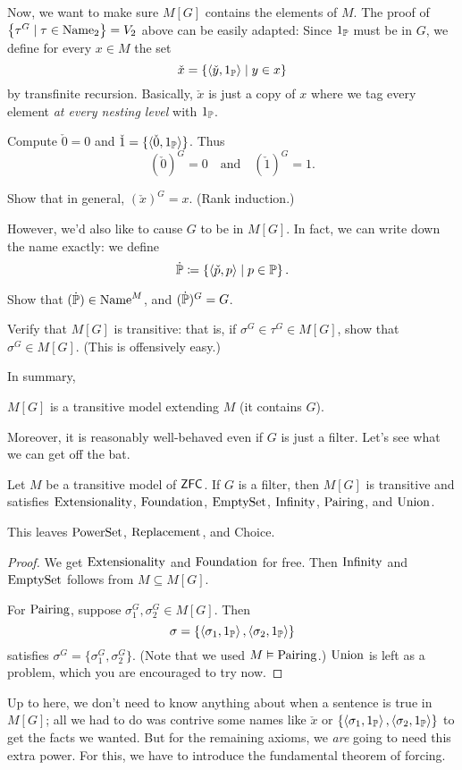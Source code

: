 Now, we want to make sure $M[G]$ contains the elements of $M$.
The proof of $\left\{ \tau^G \mid \tau \in \text{Name}_2 \right\} = V_2$ above can be easily adapted:
Since $1_\mathbb P$ must be in $G$, we define
for every $x \in M$ the set
\[ \check x = \left\{ \left<\check y, 1_\mathbb P\right> \mid y \in x \right\} \]
by transfinite recursion.
Basically, $\check x$ is just a copy of $x$ where we tag every element \emph{at every nesting level}
with $1_\mathbb P$.

\begin{example}
	Compute $\check 0 = 0$ and $\check 1 = \{ \langle \check 0, 1_\mathbb P \rangle \}$.
	Thus \[ (\check 0)^G = 0 \quad\text{and}\quad (\check 1)^G = 1. \]
\end{example}
\begin{ques}
	Show that in general, $(\check x)^G = x$.
	(Rank induction.)
\end{ques}

However, we'd also like to cause $G$ to be in $M[G]$.
In fact, we can write down the name exactly: we define
\[ \dot {\mathbb P} \coloneqq \left\{ \left<\check p, p\right> \mid p \in \mathbb P \right\}. \]
\begin{ques}
	Show that $(\dot {\mathbb P}) \in \text{Name}^M$, and $(\dot {\mathbb P})^G = G$.
\end{ques}
\begin{ques}
	Verify that $M[G]$ is transitive:
	that is, if $\sigma^G \in \tau^G \in M[G]$, show that $\sigma^G \in M[G]$.
	(This is offensively easy.)
\end{ques}

In summary,
\begin{moral}
	$M[G]$ is a transitive model extending $M$ (it contains $G$).
\end{moral}

Moreover, it is reasonably well-behaved even if $G$ is just a filter.
Let's see what we can get off the bat.
\begin{lemma}
	Let $M$ be a transitive model of $\mathsf{ZFC}$.
	If $G$ is a filter, then $M[G]$ is transitive
	and satisfies $\mathrm{Extensionality}$, $\mathrm{Foundation}$,
	$\mathrm{EmptySet}$, $\mathrm{Infinity}$, $\mathrm{Pairing}$, and $\mathrm{Union}$.
\end{lemma}

This leaves $\mathrm{PowerSet}$, $\mathrm{Replacement}$, and Choice.
\begin{proof}
	We get $\mathrm{Extensionality}$ and $\mathrm{Foundation}$ for free.
	Then $\mathrm{Infinity}$ and $\mathrm{EmptySet}$ follows from $M \subseteq M[G]$.

	For $\mathrm{Pairing}$, suppose $\sigma_1^G, \sigma_2^G \in M[G]$.
	Then
	\[ \sigma =
		\left\{ \left<\sigma_1, 1_\mathbb P\right>, \left<\sigma_2, 1_\mathbb P\right> \right\}
	\]
	satisfies $\sigma^G = \{\sigma_1^G, \sigma_2^G\}$.
	(Note that we used $M \vDash \mathrm{Pairing}$.)
	$\mathrm{Union}$ is left as a problem, which you are encouraged to try now.
\end{proof}
Up to here, we don't need to know anything about when a sentence is true in $M[G]$;
all we had to do was contrive some names like $\check x$ or
$\left\{ \left<\sigma_1, 1_\mathbb P\right>, \left<\sigma_2, 1_\mathbb P\right> \right\}$
to get the facts we wanted.
But for the remaining axioms, we \emph{are} going to need this extra power.
For this, we have to introduce the fundamental theorem of forcing.

